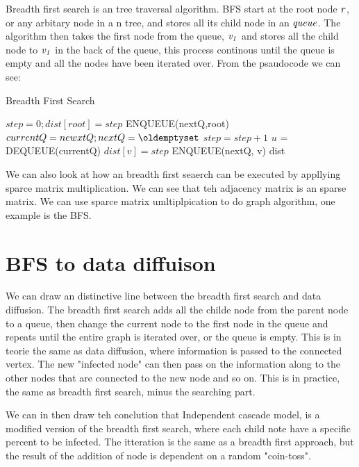 Breadth first search is an tree traversal algorithm. BFS start at the root node $\it{r}$, or any arbitary node in a n tree, and stores all its child node in an $\it{queue}$. The algorithm then takes the first node from the queue, $\it{v_1}$ and stores all the child node to $\it{v_1}$ in the back of the queue, this process continous until the queue is empty and all the nodes have been iterated over. From the psaudocode we can see:

\begin{algorithm}
\caption{Breadth First Search}
\begin{algorithmic}[1]
\State $step = 0; dist[root] = step$
\State ENQUEUE(nextQ,root)
\State $currentQ = newxtQ; nextQ = \oldemptyset$
\State $step = step+1$
\State$ u$ = DEQUEUE(currentQ)
\State $dist[v] = step$
\State ENQUEUE(nextQ, v)
\EndIf
\EndFor
\EndWhile
\EndWhile
\Return dist
\end{algorithmic}
\end{algorithm}

We can also look at how an breadth first seaerch can be executed by appllying  sparce matrix multiplication. We can see that teh adjacency matrix is an sparse matrix. We can use sparce matrix umltiplpication to do graph algorithm, one example is the BFS. 


\section{BFS to data diffuison}
We can draw an distinctive line between the breadth first search and data diffusion. The breadth first search adds all the childe node from the parent node to a queue, then change the current node to the first node in the queue and repeats until the entire graph is iterated over, or the queue is empty. This is in teorie the same as data diffusion, where information is passed to the connected vertex. The new "infected node" can then pass on the information along to the other nodes that are connected to the new node and so on. This is in practice, the same as breadth first search, minus the searching part. 

We can in then draw teh conclution that Independent cascade model, is a modified version of the breadth first search, where each child note have a specific percent to be infected. The itteration is the same as a breadth first approach, but the result of the addition of node is dependent on a random "coin-toss".


